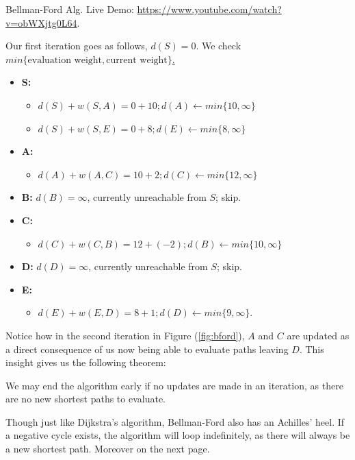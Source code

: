 \vspace{-1em}
\begin{Tip}
    Bellman-Ford Alg. Live Demo: \url{https://www.youtube.com/watch?v=obWXjtg0L64}.
\end{Tip}
\noindent
Our first iteration goes as follows, $d(S)=0$. We check \underline{$min\{\text{evaluation weight},\text{current weight}\}$.}
\begin{itemize}
    \item \textbf{S:}
    \vspace{-2em}
    \begin{itemize}
        \item [] $d(S)+w(S,A)=0+10; d(A)\gets min\{10,\infty\}$
        \item [] $d(S)+w(S,E)=0+8; d(E)\gets min\{8,\infty\}$
    \end{itemize}
    \item \textbf{A:}
    \vspace{-2em}
    \begin{itemize}
        \item [] $d(A)+w(A,C)=10+2; d(C)\gets min\{12,\infty\}$
    \end{itemize}
    \item \textbf{B:} \hspace{.5em} $d(B)=\infty$, currently unreachable from $S$; skip.
    \item \textbf{C:}
    \vspace{-2em}
    \begin{itemize}
        \item [] $d(C)+w(C,B)=12+(-2); d(B)\gets min\{10,\infty\}$
    \end{itemize}
    \item \textbf{D:} \hspace{.5em} $d(D)=\infty$, currently unreachable from $S$; skip.
    \item \textbf{E:}
    \vspace{-2em}
    \begin{itemize}
        \item [] $d(E)+w(E,D)=8+1; d(D)\gets min\{9,\infty\}$.
    \end{itemize}
\end{itemize}
\noindent
Notice how in the second iteration in Figure (\ref{fig:bford}), $A$ and $C$ are updated as a direct consequence of us now being 
able to evaluate paths leaving $D$. This insight gives us the following theorem:

\begin{theo}

    We may end the algorithm early if no updates are made in an iteration, as there are no new shortest paths to evaluate.
\end{theo}
\noindent
Though just like Dijkstra's algorithm, Bellman-Ford also has an Achilles' heel. If a negative cycle exists, the algorithm will 
loop indefinitely, as there will always be a new shortest path. Moreover on the next page.


